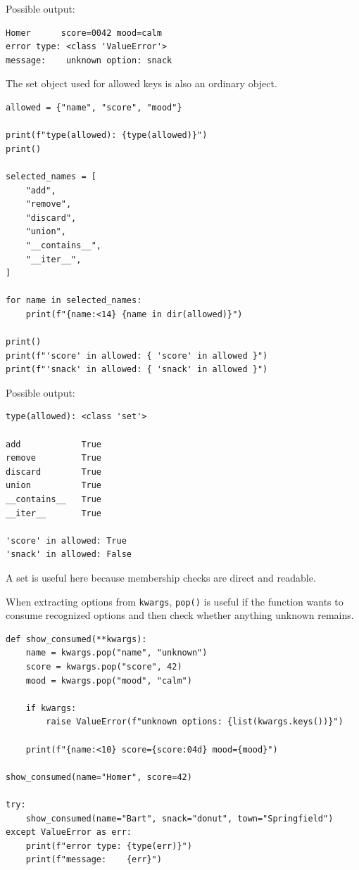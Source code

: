 Possible output:

\begin{verbatim}
Homer      score=0042 mood=calm
error type: <class 'ValueError'>
message:    unknown option: snack
\end{verbatim}

The set object used for allowed keys is also an ordinary object.

\begin{verbatim}
allowed = {"name", "score", "mood"}

print(f"type(allowed): {type(allowed)}")
print()

selected_names = [
    "add",
    "remove",
    "discard",
    "union",
    "__contains__",
    "__iter__",
]

for name in selected_names:
    print(f"{name:<14} {name in dir(allowed)}")

print()
print(f"'score' in allowed: { 'score' in allowed }")
print(f"'snack' in allowed: { 'snack' in allowed }")
\end{verbatim}

Possible output:

\begin{verbatim}
type(allowed): <class 'set'>

add            True
remove         True
discard        True
union          True
__contains__   True
__iter__       True

'score' in allowed: True
'snack' in allowed: False
\end{verbatim}

A set is useful here because membership checks are direct and readable.

When extracting options from \texttt{kwargs}, \texttt{pop()} is useful if the function wants to consume recognized options and then check whether anything unknown remains.

\begin{verbatim}
def show_consumed(**kwargs):
    name = kwargs.pop("name", "unknown")
    score = kwargs.pop("score", 42)
    mood = kwargs.pop("mood", "calm")

    if kwargs:
        raise ValueError(f"unknown options: {list(kwargs.keys())}")

    print(f"{name:<10} score={score:04d} mood={mood}")

show_consumed(name="Homer", score=42)

try:
    show_consumed(name="Bart", snack="donut", town="Springfield")
except ValueError as err:
    print(f"error type: {type(err)}")
    print(f"message:    {err}")
\end{verbatim}

